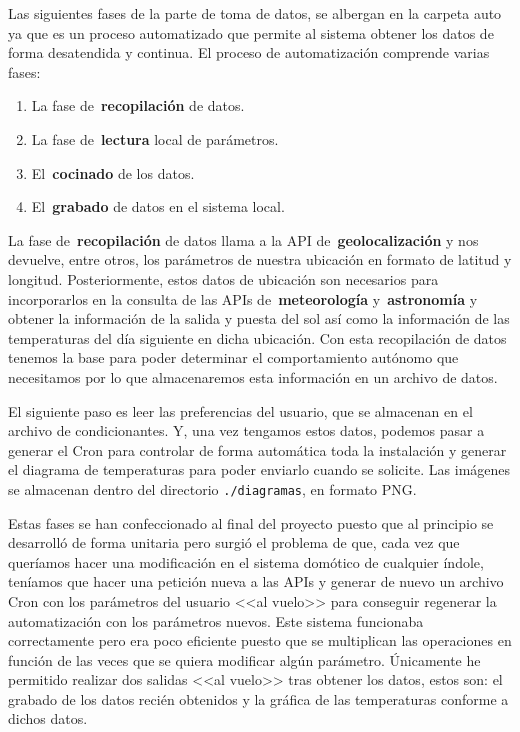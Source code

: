 Las siguientes fases de la parte de toma de datos, se albergan en la carpeta auto ya que es un proceso automatizado que permite al sistema obtener los datos de forma desatendida y continua.
El proceso de automatización comprende varias fases:
\begin{enumerate}
    \item La fase de~\textbf{recopilación} de datos.
    \item La fase de~\textbf{lectura} local de parámetros.
    \item El~\textbf{cocinado} de los datos.
    \item El~\textbf{grabado} de datos en el sistema local.
\end{enumerate}
La fase de~\textbf{recopilación} de datos llama a la API de~\textbf{geolocalización} y nos devuelve, entre otros, los parámetros de nuestra ubicación en formato de latitud y longitud. Posteriormente, estos datos de ubicación son necesarios para incorporarlos en la consulta de las APIs de~\textbf{meteorología} y~\textbf{astronomía} y obtener la información de la salida y puesta del sol así como la información de las temperaturas del día siguiente en dicha ubicación. Con esta recopilación de datos tenemos la base para poder determinar el comportamiento autónomo que necesitamos por lo que almacenaremos esta información en un archivo de datos.

El siguiente paso es leer las preferencias del usuario, que se almacenan en el archivo de condicionantes. Y, una vez tengamos estos datos, podemos pasar a generar el Cron para controlar de forma automática toda la instalación y generar el diagrama de temperaturas para poder enviarlo cuando se solicite. Las imágenes se almacenan dentro del directorio \texttt{./diagramas}, en formato PNG.

Estas fases se han confeccionado al final del proyecto puesto que al principio se desarrolló de forma unitaria pero surgió el problema de que, cada vez que queríamos hacer una modificación en el sistema domótico de cualquier índole, teníamos que hacer una petición nueva a las APIs y generar de nuevo un archivo Cron con los parámetros del usuario <<al vuelo>> para conseguir regenerar la automatización con los parámetros nuevos. Este sistema funcionaba correctamente pero era poco eficiente puesto que se multiplican las operaciones en función de las veces que se quiera modificar algún parámetro.
Únicamente he permitido realizar dos salidas <<al vuelo>> tras obtener los datos, estos son: el grabado de los datos recién obtenidos y la gráfica de las temperaturas conforme a dichos datos.

